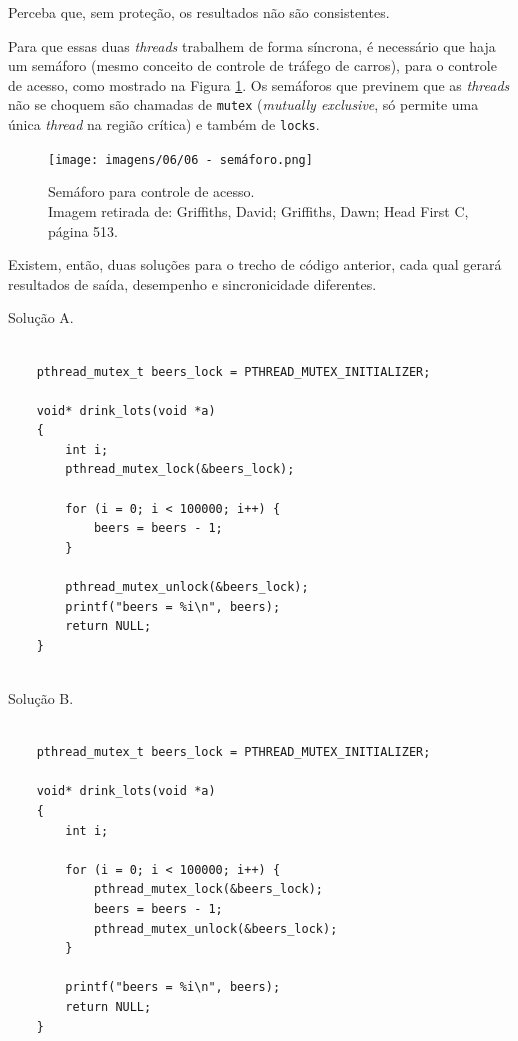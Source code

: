 Perceba que, sem proteção, os resultados não são consistentes.

Para que essas duas \emph{threads} trabalhem de forma síncrona, é
necessário que haja um semáforo (mesmo conceito de controle de tráfego
de carros), para o controle de acesso, como mostrado na Figura \ref{fig:Semáforo para controle de acesso.}. Os
semáforos que previnem que as \emph{threads} não se choquem são chamadas
de \texttt{mutex} (\emph{mutually exclusive}, só permite uma única
\emph{thread} na região crítica) e também de \texttt{locks}.


\begin{figure}[h!]
\centering
\texttt{[image: imagens/06/06 - semáforo.png]}
\caption{Semáforo para controle de acesso.  \\
Imagem retirada de: Griffiths, David; Griffiths, Dawn; Head First C,
página 513. \\}
\label{fig:Semáforo para controle de acesso.}
\end{figure}



Existem, então, duas soluções para o trecho de código anterior, cada
qual gerará resultados de saída, desempenho e sincronicidade diferentes.

Solução A.


\begin{verbatim}

    pthread_mutex_t beers_lock = PTHREAD_MUTEX_INITIALIZER;
    
    void* drink_lots(void *a)
    {
        int i;
        pthread_mutex_lock(&beers_lock);
        
        for (i = 0; i < 100000; i++) {
            beers = beers - 1;
        }
        
        pthread_mutex_unlock(&beers_lock);
        printf("beers = %i\n", beers);
        return NULL;
    }
    
\end{verbatim}





Solução B.

\begin{verbatim}

    pthread_mutex_t beers_lock = PTHREAD_MUTEX_INITIALIZER;
    
    void* drink_lots(void *a)
    {
        int i;
        
        for (i = 0; i < 100000; i++) {
            pthread_mutex_lock(&beers_lock);
            beers = beers - 1;
            pthread_mutex_unlock(&beers_lock);
        }
        
        printf("beers = %i\n", beers);
        return NULL;
    }
    
\end{verbatim}



